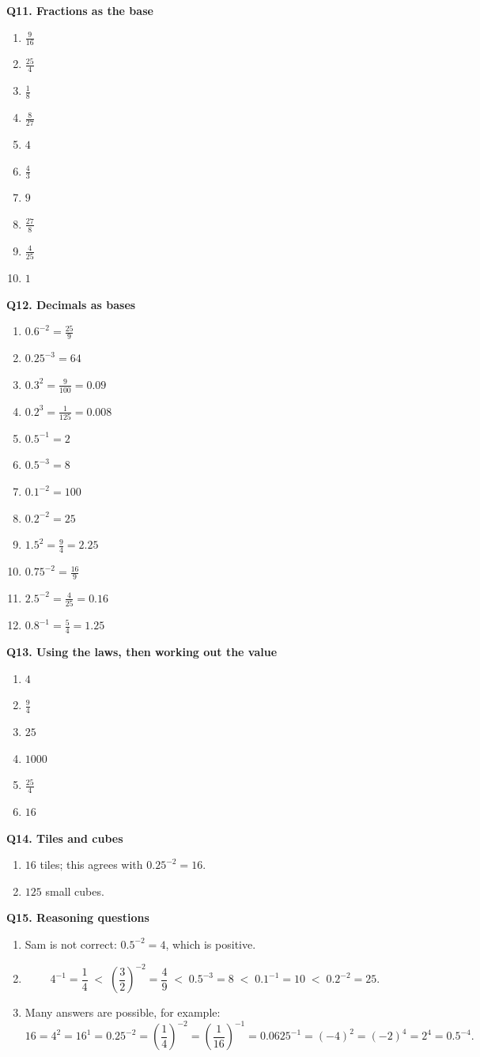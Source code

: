 \documentclass[12pt,a4paper]{article}
\begin{document}
\textbf{Q11. Fractions as the base}
\begin{enumerate}
\item \(\frac9{16}\)
\item \(\frac{25}{4}\)
\item \(\frac18\)
\item \(\frac8{27}\)
\item \(4\)
\item \(\frac43\)
\item \(9\)
\item \(\frac{27}{8}\)
\item \(\frac4{25}\)
\item \(1\)
\end{enumerate}

\textbf{Q12. Decimals as bases}
\begin{enumerate}
\item \(0.6^{-2}=\frac{25}{9}\)
\item \(0.25^{-3}=64\)
\item \(0.3^2=\frac9{100}=0.09\)
\item \(0.2^3=\frac1{125}=0.008\)
\item \(0.5^{-1}=2\)
\item \(0.5^{-3}=8\)
\item \(0.1^{-2}=100\)
\item \(0.2^{-2}=25\)
\item \(1.5^2=\frac94=2.25\)
\item \(0.75^{-2}=\frac{16}{9}\)
\item \(2.5^{-2}=\frac4{25}=0.16\)
\item \(0.8^{-1}=\frac54=1.25\)
\end{enumerate}

\textbf{Q13. Using the laws, then working out the value}
\begin{enumerate}
\item \(4\)
\item \(\frac94\)
\item \(25\)
\item \(1000\)
\item \(\frac{25}{4}\)
\item \(16\)
\end{enumerate}

\textbf{Q14. Tiles and cubes}
\begin{enumerate}
\item \(16\) tiles; this agrees with \(0.25^{-2}=16\).
\item \(125\) small cubes.
\end{enumerate}

\textbf{Q15. Reasoning questions}
\begin{enumerate}
\item Sam is not correct: \(0.5^{-2}=4\), which is positive.
\item
\[
4^{-1}=\frac14
\;<\;
\left(\frac32\right)^{-2}=\frac49
\;<\;
0.5^{-3}=8
\;<\;
0.1^{-1}=10
\;<\;
0.2^{-2}=25.
\]
\item Many answers are possible, for example:
\[
16=4^2=16^1=0.25^{-2}=\left(\frac14\right)^{-2}
=\left(\frac1{16}\right)^{-1}=0.0625^{-1}
=(-4)^2=(-2)^4=2^4=0.5^{-4}.
\]
\end{enumerate}
\end{document}
